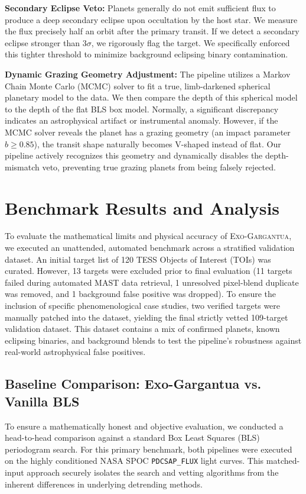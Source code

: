 \documentclass[twocolumn,linenumbers]{aastex701}
\begin{document}
\textbf{Secondary Eclipse Veto:} Planets generally do not emit sufficient flux to produce a deep secondary eclipse upon occultation by the host star. We measure the flux precisely half an orbit after the primary transit. If we detect a secondary eclipse stronger than $3\sigma$, we rigorously flag the target. We specifically enforced this tighter threshold to minimize background eclipsing binary contamination.

\textbf{Dynamic Grazing Geometry Adjustment:} The pipeline utilizes a Markov Chain Monte Carlo (MCMC) solver to fit a true, limb-darkened spherical planetary model to the data. We then compare the depth of this spherical model to the depth of the flat BLS box model. Normally, a significant discrepancy indicates an astrophysical artifact or instrumental anomaly. However, if the MCMC solver reveals the planet has a grazing geometry (an impact parameter $b \ge 0.85$), the transit shape naturally becomes V-shaped instead of flat. Our pipeline actively recognizes this geometry and dynamically disables the depth-mismatch veto, preventing true grazing planets from being falsely rejected.

\section{Benchmark Results and Analysis} \label{sec:benchmarks}

To evaluate the mathematical limits and physical accuracy of \textsc{Exo-Gargantua}, we executed an unattended, automated benchmark across a stratified validation dataset. An initial target list of 120 TESS Objects of Interest (TOIs) was curated. However, 13 targets were excluded prior to final evaluation (11 targets failed during automated MAST data retrieval, 1 unresolved pixel-blend duplicate was removed, and 1 background false positive was dropped). To ensure the inclusion of specific phenomenological case studies, two verified targets were manually patched into the dataset, yielding the final strictly vetted 109-target validation dataset. This dataset contains a mix of confirmed planets, known eclipsing binaries, and background blends to test the pipeline's robustness against real-world astrophysical false positives.

\subsection{Baseline Comparison: Exo-Gargantua vs. Vanilla BLS}
To ensure a mathematically honest and objective evaluation, we conducted a head-to-head comparison against a standard Box Least Squares (BLS) periodogram search. For this primary benchmark, both pipelines were executed on the highly conditioned NASA SPOC \texttt{PDCSAP\_FLUX} light curves. This matched-input approach securely isolates the search and vetting algorithms from the inherent differences in underlying detrending methods.
\end{document}
